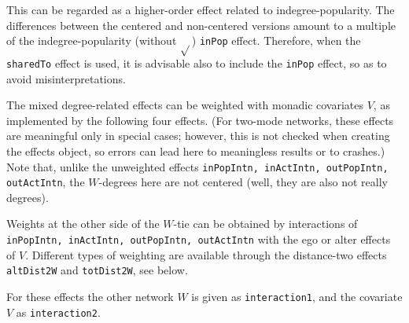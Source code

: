 \documentclass[a4paper,fleqn,11pt]{article}
\newcommand{\+}{\, + \,}
\newcounter{savenumi}
\begin{document}
\begin{enumerate}
 This can be regarded as a higher-order effect related to indegree-popularity.
 The differences between the centered and non-centered versions amount to
 a multiple of the indegree-popularity (without $\sqrt{}$) \texttt{inPop} effect.
 Therefore, when the \texttt{sharedTo} effect is used, it is advisable
 also to include the \texttt{inPop} effect, so as to avoid misinterpretations.
\setcounter{savenumi}{\value{enumi}}
\end{enumerate}

\noindent
The mixed degree-related effects can be weighted with monadic covariates $V$,
as implemented by the following four effects.
(For two-mode networks, these effects are meaningful only in special cases;
however, this is not checked when creating the effects object, so errors
can lead here to meaningless results or to crashes.)
Note that, unlike the unweighted effects
\texttt{inPopIntn, inActIntn, outPopIntn, outActIntn}, the $W$-degrees
here are not centered (well, they are also not really degrees).

Weights at the other side of the $W$-tie can be obtained by interactions of
\texttt{inPopIntn, inActIntn, outPopIntn, outActIntn} with the ego or
alter effects of $V$.
Different types of weighting are available through the distance-two
effects \texttt{altDist2W} and \texttt{totDist2W}, see below.

For these effects the other network $W$ is given as \texttt{interaction1},
and the covariate $V$ as \texttt{interaction2}.
\end{document}
